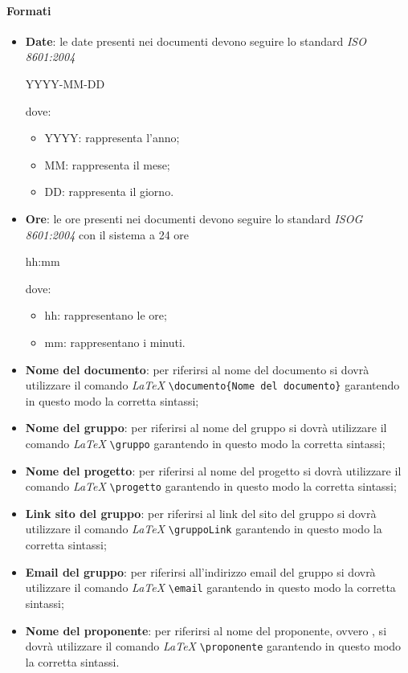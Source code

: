 \paragraph{Formati}
\begin{itemize}
   \item \textbf{Date}: le date presenti nei documenti devono seguire lo standard \textit{ISO 8601:2004}
   \begin{center}
     YYYY-MM-DD
   \end{center}
   dove:
   \begin{itemize}
     \item YYYY: rappresenta l'anno;
     \item MM: rappresenta il mese;
     \item DD: rappresenta il giorno.
   \end{itemize}
   \item \textbf{Ore}: le ore presenti nei documenti devono seguire lo standard \textit{ISOG 8601:2004}
   con il sistema a 24 ore
   \begin{center}
     hh:mm
   \end{center}
   dove:
   \begin{itemize}
     \item hh: rappresentano le ore;
     \item mm: rappresentano i minuti.
   \end{itemize}
   \item \textbf{Nome del documento}: per riferirsi al nome del documento si
   dovrà utilizzare il comando \textit{\LaTeX{}}   \verb|\documento{Nome del documento}|
   garantendo in questo modo la corretta sintassi;
   \item \textbf{Nome del gruppo}: per riferirsi al nome del gruppo si dovrà
   utilizzare il comando \textit{\LaTeX{}} \verb|\gruppo| garantendo in questo modo la corretta sintassi;
   \item \textbf{Nome del progetto}: per riferirsi al nome del progetto si dovrà
   utilizzare il comando \textit{\LaTeX{}} \verb|\progetto| garantendo in questo modo la corretta sintassi;
   \item \textbf{Link sito del gruppo}: per riferirsi al link del sito del gruppo si dovrà
   utilizzare il comando \textit{\LaTeX{}} \verb|\gruppoLink| garantendo in questo modo la corretta sintassi;
   \item \textbf{Email del gruppo}: per riferirsi all'indirizzo email del gruppo si dovrà
   utilizzare il comando \textit{\LaTeX{}} \verb|\email| garantendo in questo modo la corretta sintassi;
   \item \textbf{Nome del proponente}: per riferirsi al nome del proponente, ovvero \proponente, si dovrà
   utilizzare il comando \textit{\LaTeX{}}  \verb|\proponente| garantendo in questo modo la corretta
   sintassi.
      \end{itemize}


